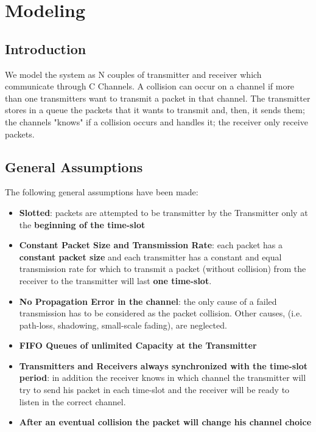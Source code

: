 \section{Modeling}
\subsection{Introduction}
We model the system as N couples of transmitter and receiver which communicate through C Channels. A collision can occur on a channel if more than one transmitters want to transmit a packet in that channel. The transmitter stores in a queue the packets that it wants to transmit and, then, it sends them; the channels "knows" if a collision occurs and handles it; the receiver only receive packets.  
\subsection{General Assumptions}
The following general assumptions have been made:
\begin{itemize}
	\item \textbf{Slotted}: packets are attempted to be transmitter by the Transmitter only at the \textbf{beginning of the time-slot}
	\item \textbf{Constant Packet Size and Transmission Rate}: each packet has a \textbf{constant packet size} and each transmitter has a constant and equal transmission rate for which to transmit a packet (without collision) from the receiver to the transmitter will last \textbf{one time-slot}.
	\item \textbf{No Propagation Error in the channel}: the only cause of a failed transmission has to be considered as the packet collision. Other causes, (i.e. path-loss, shadowing, small-scale fading), are neglected. 
	\item \textbf{FIFO Queues of unlimited Capacity at the Transmitter} 
	\item \textbf{Transmitters and Receivers always synchronized with the time-slot period}: in addition the receiver knows in which channel the transmitter will try to send his packet in each time-slot and the receiver will be ready to listen in the correct channel.
	\item \textbf{After an eventual collision the packet will change his channel choice}
\end{itemize}

